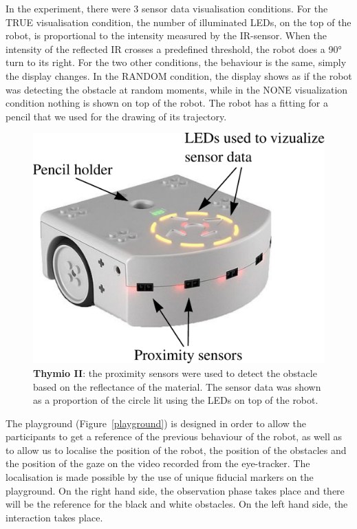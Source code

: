 \documentclass{sig-alternate}
\begin{document}
In the experiment, there were 3 sensor data visualisation conditions.  For the
{\sf TRUE} visualisation condition, the number of illuminated LEDs, on the top of the
robot, is proportional to the intensity measured by the IR-sensor. When the
intensity of the reflected IR crosses a predefined threshold, the robot does a
90° turn to its right. For the two other conditions, the behaviour is the same,
simply the display changes. In the {\sf RANDOM} condition, the display shows as if the
robot was detecting the obstacle at random moments, while in the {\sf NONE}
visualization condition nothing is shown on top of the robot. The robot has a
fitting for a pencil that we used for the drawing of its trajectory.

\begin{figure}
    \centering
    \includegraphics[width=0.9\linewidth]{thymio}
    \caption{\small \textbf{Thymio II}: the proximity sensors were used to
    detect the obstacle based on the reflectance of the material. The sensor
    data was shown as a proportion of the circle lit using the LEDs on top of the
    robot.}

    \label{thymio}
\end{figure}

The playground (Figure~\ref{playground}) is designed in order to allow the
participants to get a reference of the previous behaviour of the robot, as well
as to allow us to localise the position of the robot, the position of the
obstacles and the position of the gaze on the video recorded from the
eye-tracker. The localisation is made possible by the use of unique fiducial
markers on the playground. On the right hand side, the observation phase takes
place and there will be the reference for the black and white obstacles. On the
left hand side, the interaction takes place.
\end{document}
